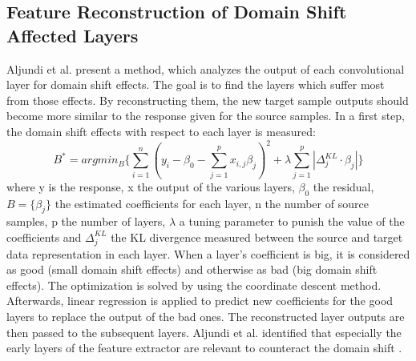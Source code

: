 \subsection{Feature Reconstruction of Domain Shift Affected Layers}
Aljundi et al. \cite{Aljundi2016} present a method, which analyzes the output of each convolutional layer for domain shift effects. The goal is to find the layers which suffer most from those effects. By reconstructing them, the new target sample outputs should become more similar to the response given for the source samples. In a first step, the domain shift effects with respect to each layer is measured:
\begin{equation}
    B^{*} = argmin_{B} \{ \sum_{i=1}^{n}( y_{i}-\beta_{0}-\sum_{j=1}^{p}x_{i,j}\beta_{j})^{2} + \lambda \sum_{j=1}^{p}|\Delta_{j}^{KL}\cdot \beta_{j}| \}
\end{equation}
where y is the response, x the output of the various layers, $\beta_{0}$ the residual, $B = \{\beta_{j}\}$ the estimated coefficients for each layer, n the number of
source samples, p the number of layers, $\lambda$ a tuning parameter to punish the value of the coefficients and $\Delta_{j}^{KL}$ the KL divergence measured between the source and target data representation in each layer. When a layer's coefficient is big, it is considered as good (small domain shift effects) and otherwise as bad (big domain shift effects). The optimization is solved by using the coordinate descent method. Afterwards, linear regression is applied to predict new coefficients for the good layers to replace the output of the bad ones. The reconstructed layer outputs are then passed to the subsequent layers. Aljundi et al. identified that especially the early layers of the feature extractor are relevant to counteract the domain shift \cite{Aljundi2016}.